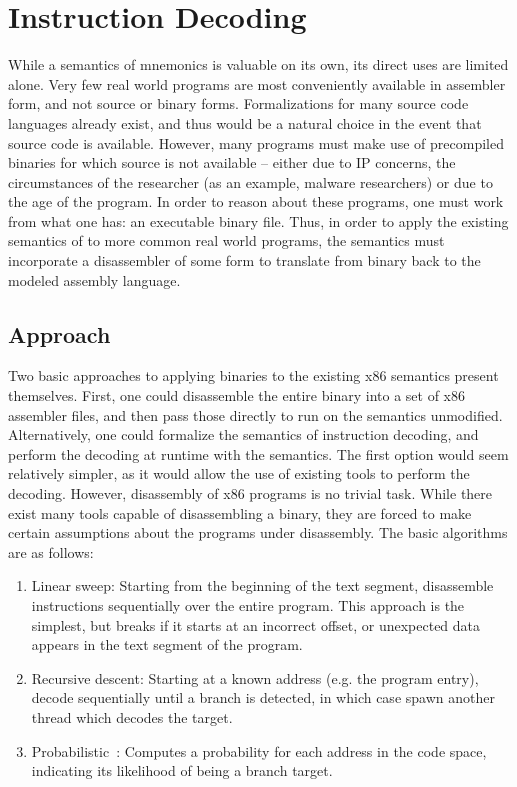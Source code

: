 \section{Instruction Decoding}

While a semantics of \GENISA mnemonics is valuable on its own, its direct uses are limited alone.  Very few real world programs are most conveniently available in assembler form, and not source or binary forms.   Formalizations for many source code languages already exist, and thus would be a natural choice in the event that source code is available.  However, many programs must make use of precompiled binaries for which source is not available – either due to IP concerns, the circumstances of the researcher (as an example, malware researchers) or due to the age of the program.  In order to reason about these programs, one must work from what one has: an executable binary file.  Thus, in order to apply the existing semantics of \GENISA to more common real world programs, the semantics must incorporate a disassembler of some form to translate from binary back to the modeled assembly language.
\subsection{Approach}
Two basic approaches to applying binaries to the existing x86 semantics present themselves.  First, one could disassemble the entire binary into a set of x86 assembler files, and then pass those directly to run on the semantics unmodified.  Alternatively, one could formalize the semantics of instruction decoding, and perform the decoding at runtime with the semantics.  The first option would seem relatively simpler, as it would allow the use of existing tools to perform the decoding.  However, disassembly of x86 programs is no trivial task.  While there exist many tools capable of disassembling a binary, they are forced to make certain assumptions about the programs under disassembly.  The basic algorithms are as follows:

\begin{enumerate}
    \item Linear sweep: Starting from the beginning of the text segment, disassemble instructions sequentially over the entire program.  This approach is the simplest, but breaks if it starts at an incorrect offset, or unexpected data appears in the text segment of the program.
    \item Recursive descent: Starting at a known address (e.g. the program entry), decode sequentially until a branch is detected, in which case spawn another thread which decodes the target.
    \item Probabilistic~\cite{Miller:2019}: Computes a probability for each address in the code space, indicating its likelihood of being a branch target. 
\end{enumerate}

